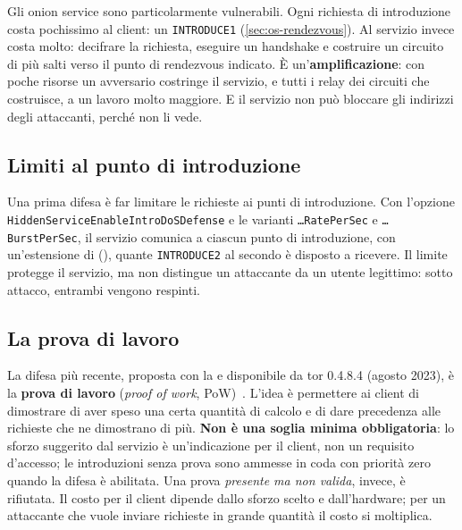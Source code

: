 Gli onion service sono particolarmente vulnerabili. Ogni richiesta di introduzione costa pochissimo al client: un \texttt{INTRODUCE1} (\cref{sec:os-rendezvous}). Al servizio invece costa molto: decifrare la richiesta, eseguire un handshake e costruire un circuito di più salti verso il punto di rendezvous indicato. È un'\textbf{amplificazione}: con poche risorse un avversario costringe il servizio, e tutti i relay dei circuiti che costruisce, a un lavoro molto maggiore. E il servizio non può bloccare gli indirizzi degli attaccanti, perché non li vede.

\subsection{Limiti al punto di introduzione}

Una prima difesa è far limitare le richieste ai punti di introduzione. Con l'opzione \texttt{HiddenService\-EnableIntroDoS\-Defense} e le varianti \texttt{\ldots RatePerSec} e \texttt{\ldots BurstPerSec}, il servizio comunica a ciascun punto di introduzione, con un'estensione di  (), quante \texttt{INTRODUCE2} al secondo è disposto a ricevere. Il limite protegge il servizio, ma non distingue un attaccante da un utente legittimo: sotto attacco, entrambi vengono respinti.

\subsection{La prova di lavoro}

La difesa più recente, proposta con la  e disponibile da tor 0.4.8.4 (agosto 2023), è la \textbf{prova di lavoro} (\emph{proof of work}, PoW)~. L'idea è permettere ai client di dimostrare di aver speso una certa quantità di calcolo e di dare precedenza alle richieste che ne dimostrano di più. \textbf{Non è una soglia minima obbligatoria}: lo sforzo suggerito dal servizio è un'indicazione per il client, non un requisito d'accesso; le introduzioni senza prova sono ammesse in coda con priorità zero quando la difesa è abilitata. Una prova \emph{presente ma non valida}, invece, è rifiutata. Il costo per il client dipende dallo sforzo scelto e dall'hardware; per un attaccante che vuole inviare richieste in grande quantità il costo si moltiplica.

